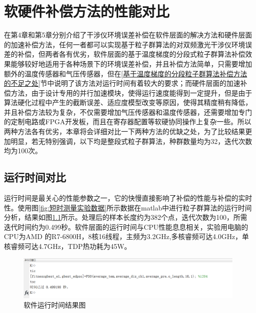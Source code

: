 \chapter{软硬件补偿方法的性能对比}
在第4章和第5章分别介绍了干涉仪环境误差补偿在软件层面的解决方法和硬件层面的加速补偿方法，任何一者都可以实现基于粒子群算法的对双频激光干涉仪环境误差的补偿，但两者各有优劣，软件层面的基于温度梯度的分段式粒子群算法补偿效果能够较好地适用于各种场景下的环境误差补偿，并且补偿方法简单，只需要增加额外的温度传感器和气压传感器，但在\ref{基于温度梯度的分段粒子群算法补偿方法的不足之处}节中说明了该方法对运行时间有着较大的要求；而硬件层面的加速补偿方法，由于设计专用的并行加速模块，使得运行速度能得到一定提升，但是由于算法硬化过程中产生的截断误差、适应度模型改变等原因，使得其精度稍有降低，并且补偿方法较为复杂，不仅需要增加气压传感器和温度传感器，还需要增加专门的定制电路或FPGA开发板，而且在寄存器配置等软硬协同操作上复杂一些。所以两种方法各有优劣，本章将会详细对比一下两种方法的优缺之处，为了比较结果更加明显，若无特别强调，以下均是整段式粒子群算法，种群数量均为32，迭代次数均为100次。
\section{运行时间对比}
运行时间是最关心的性能参数之一，它的快慢直接影响了补偿的性能与补偿的实时性。使用图\ref{fig:短时测量实验数据}所示数据在matlab中进行粒子群算法的运行时间分析，结果如图\ref{fig:软件运行时间结果图}所示。处理后的样本长度约为382个点，迭代次数为100，所需迭代时间约为0.499秒。软件层面的运行时间与CPU性能息息相关，实验用电脑的CPU为AMD 的R7-6800H，8核16线程，主频为3.2GHz,多核睿频可达4.0GHz，单核睿频可达4.7GHz，TDP热功耗为45W。
\begin{figure}[htb]
  \centering
  \includegraphics[width=14cm]{fig/6-fig/软件运行时间.png}
  \caption{软件运行时间结果图}
  \label{fig:软件运行时间结果图}
\end{figure}

